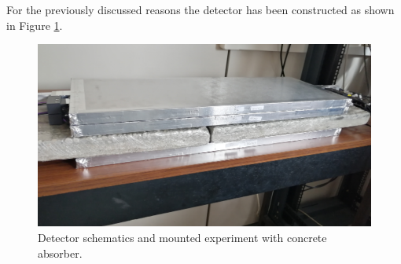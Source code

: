 \documentclass[../main.tex]{subfiles}
\begin{document}
\noindent For the previously discussed reasons the detector has been constructed as shown in Figure \ref{fig:setUp}.

\begin{figure}[htb]
    \centering
    
    \includegraphics[width = 0.4 \linewidth]{images/setup.jpg}
    \caption{Detector schematics and mounted experiment with concrete absorber.}
    \label{fig:setUp}
\end{figure}
\end{document}
